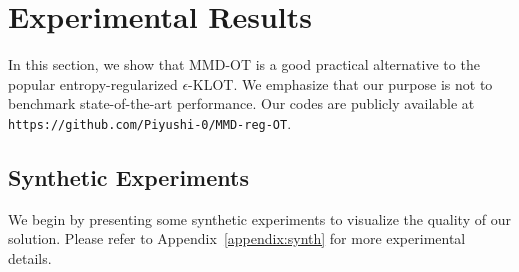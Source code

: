 \section{Experimental Results}\label{sec:experiments}
In this section, we show that MMD-OT is a good practical alternative to the popular entropy-regularized $\epsilon$-KLOT. We emphasize that our purpose is not to benchmark state-of-the-art performance. 
\newline
Our codes are publicly available at \texttt{https://github.com/Piyushi-0/MMD-reg-OT}.
\subsection{Synthetic Experiments}\label{synth}
We begin by presenting some synthetic experiments to visualize the quality of our solution. Please refer to Appendix~\ref{appendix:synth} for more experimental details.
